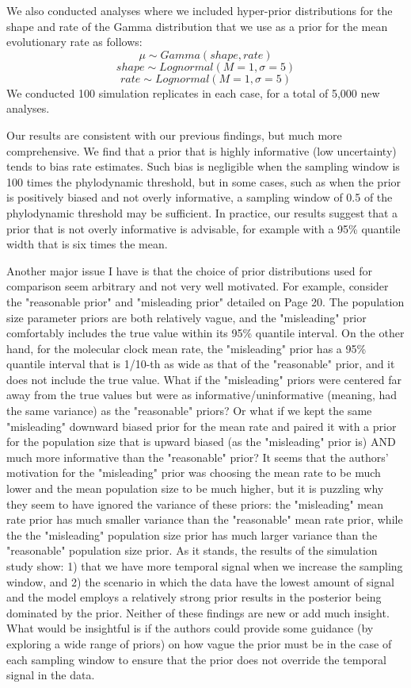 \documentclass[11pt]{article}
\begin{document}
{We also conducted analyses where we included hyper-prior distributions for the shape and rate of the Gamma distribution that we use as a prior for the mean evolutionary rate as follows:
$$
\mu \sim Gamma(shape, rate)
$$
$$
shape \sim Lognormal(M=1, \sigma=5)
$$
$$
rate \sim Lognormal(M=1, \sigma=5)
$$
We conducted 100 simulation replicates in each case, for a total of 5,000 new analyses. 

Our results are consistent with our previous findings, but much more comprehensive. We find that a prior that is highly informative (low uncertainty) tends to bias rate estimates. Such bias is negligible when the sampling window is 100 times the phylodynamic threshold, but in some cases, such as when the prior is positively biased and not overly informative, a sampling window of 0.5 of the phylodynamic threshold may be sufficient. In practice, our results suggest that a prior that is not overly informative is advisable, for example with a 95\% quantile width that is six times the mean.
}

Another major issue I have is that the choice of prior distributions used for comparison seem arbitrary and not very well motivated. For example, consider the "reasonable prior" and "misleading prior" detailed on Page 20. The population size parameter priors are both relatively vague, and the "misleading" prior comfortably includes the true value within its 95\% quantile interval. On the other hand, for the molecular clock mean rate, the "misleading" prior has a 95\% quantile interval that is 1/10-th as wide as that of the "reasonable" prior, and it does not include the true value. What if the "misleading" priors were centered far away from the true values but were as informative/uninformative (meaning, had the same variance) as the "reasonable" priors? Or what if we kept the same "misleading" downward biased prior for the mean rate and paired it with a prior for the population size that is upward biased (as the "misleading" prior is) AND much more informative than the "reasonable" prior? It seems that the authors' motivation for the "misleading" prior was choosing the mean rate to be much lower and the mean population size to be much higher, but it is puzzling why they seem to have ignored the variance of these priors: the "misleading" mean rate prior has much smaller variance than the "reasonable" mean rate prior, while the the "misleading" population size prior has much larger variance than the "reasonable" population size prior. As it stands, the results of the simulation study show: 1) that we have more temporal signal when we increase the sampling window, and 2) the scenario in which the data have the lowest amount of signal and the model employs a relatively strong prior results in the posterior being dominated by the prior. Neither of these findings are new or add much insight. What would be insightful is if the authors could provide some guidance (by exploring a wide range of priors) on how vague the prior must be in the case of each sampling window to ensure that the prior does not override the temporal signal in the data.
\end{document}
